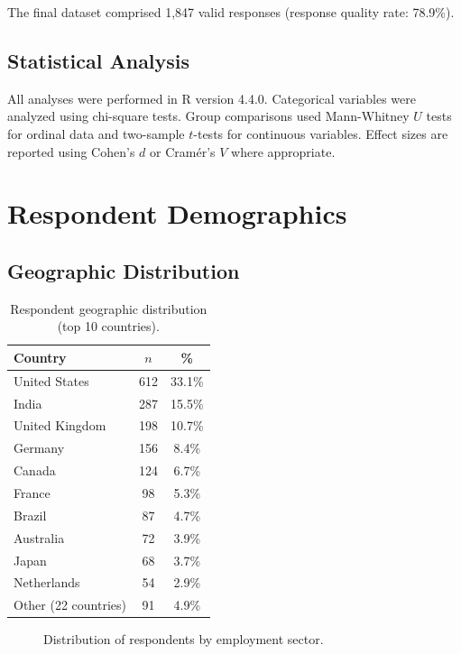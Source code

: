 \documentclass[
    language=english,
    doctype=survey-report,
    institution=none,
]{../../omnilatex}
\begin{document}
The final dataset comprised 1,847 valid responses (response quality rate:
78.9\%).

\subsection{Statistical Analysis}

All analyses were performed in R version 4.4.0. Categorical variables were
analyzed using chi-square tests. Group comparisons used Mann-Whitney $U$
tests for ordinal data and two-sample $t$-tests for continuous variables.
Effect sizes are reported using Cohen's $d$ or Cramér's $V$ where
appropriate.

\section{Respondent Demographics}
\label{sec:demographics}

\subsection{Geographic Distribution}

\begin{table}[htbp]
    \centering
    \caption{Respondent geographic distribution (top 10 countries).}
    \label{tab:geography}
    \begin{tabular}{@{}lcc@{}}
        \toprule
        Country & $n$ & \% \\
        \midrule
        United States & 612 & 33.1\% \\
        India & 287 & 15.5\% \\
        United Kingdom & 198 & 10.7\% \\
        Germany & 156 & 8.4\% \\
        Canada & 124 & 6.7\% \\
        France & 98 & 5.3\% \\
        Brazil & 87 & 4.7\% \\
        Australia & 72 & 3.9\% \\
        Japan & 68 & 3.7\% \\
        Netherlands & 54 & 2.9\% \\
        \midrule
        Other (22 countries) & 91 & 4.9\% \\
        \bottomrule
    \end{tabular}
\end{table}

\begin{figure}[htbp]
    \centering
    \caption{Distribution of respondents by employment sector.}
    \label{fig:sector-pie}
\end{figure}
\end{document}

